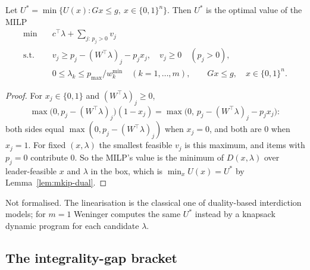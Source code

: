 \begin{proposition}\label{prop:mkip-milp}
Let $U^{*}=\min\{U(x): Gx\le g,\ x\in\{0,1\}^n\}$. Then $U^{*}$ is the optimal
value of the MILP
\begin{align*}
  \min\quad & c^{\top}\lambda+\sum_{j:\,p_j>0}v_j\\
  \text{s.t.}\quad & v_j\ge p_j-(W^{\top}\lambda)_j-p_jx_j,\quad v_j\ge 0\quad (p_j>0),\\
  & 0\le\lambda_k\le p_{\max}/w^{\min}_k\quad (k=1,\dots,m),\qquad Gx\le g,\quad x\in\{0,1\}^n.
\end{align*}
\end{proposition}
\begin{proof}
For $x_j\in\{0,1\}$ and $(W^{\top}\lambda)_j\ge 0$,
\[
  \max\bigl(0,p_j-(W^{\top}\lambda)_j\bigr)(1-x_j)=\max\bigl(0,\,p_j-(W^{\top}\lambda)_j-p_jx_j\bigr):
\]
both sides equal $\max(0,p_j-(W^{\top}\lambda)_j)$ when $x_j=0$, and both are $0$
when $x_j=1$.
For fixed $(x,\lambda)$ the smallest feasible $v_j$ is this maximum, and items
with $p_j=0$ contribute $0$. So the MILP's value is the minimum of
$D(x,\lambda)$ over leader-feasible $x$ and $\lambda$ in the box, which is
$\min_xU(x)=U^{*}$ by Lemma~\ref{lem:mkip-dual}.
\end{proof}
\noindent Not formalised. The linearisation is the classical one of
duality-based interdiction
models;\cite{caprara2016bilevel,wood1993deterministic,israeli2002shortest} for
$m=1$ Weninger computes the same $U^{*}$ instead by a knapsack dynamic program
for each candidate $\lambda$.\cite{weninger2026approx}

\subsection{The integrality-gap bracket}

